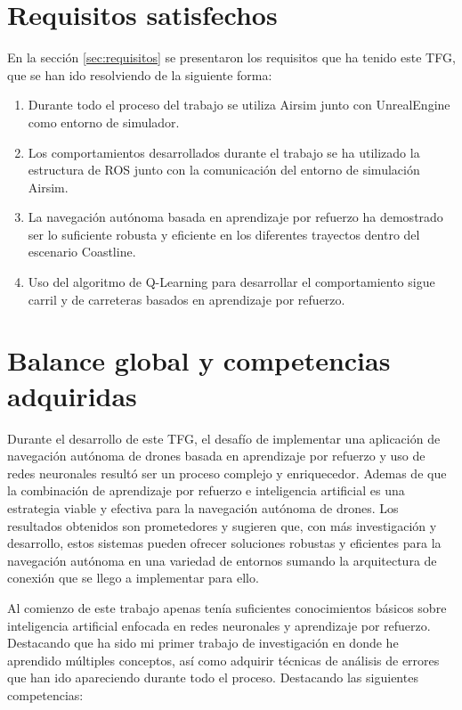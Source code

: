 \section{Requisitos satisfechos}
\label{requisitos_satisfechos}

En la sección \ref{sec:requisitos} se presentaron los requisitos que ha tenido este TFG, que se han ido resolviendo 
de la siguiente forma: 

\begin{enumerate}
    \item Durante todo el proceso del trabajo se utiliza Airsim junto con UnrealEngine como entorno de simulador.
    \item Los comportamientos desarrollados durante el trabajo se ha utilizado la estructura de ROS junto con la comunicación
    del entorno de simulación Airsim. 
    \item La navegación autónoma basada en aprendizaje por refuerzo ha demostrado ser lo suficiente robusta y eficiente en los
    diferentes trayectos dentro del escenario Coastline. 
    \item Uso del algoritmo de Q-Learning para desarrollar el comportamiento sigue carril y de carreteras basados en aprendizaje por 
    refuerzo.
\end{enumerate}


\section{Balance global y competencias adquiridas}
\label{balance_global_competencias_adquiridas}
Durante el desarrollo de este TFG, el desafío de implementar una aplicación de navegación autónoma de drones basada en
aprendizaje por refuerzo y uso de redes neuronales resultó ser un proceso complejo y enriquecedor. Ademas de que la
combinación de aprendizaje por refuerzo e inteligencia artificial es una estrategia viable y efectiva para la
navegación autónoma de drones. Los resultados obtenidos son prometedores y sugieren que, con más investigación y
desarrollo, estos sistemas pueden ofrecer soluciones robustas y eficientes para la navegación autónoma en una variedad
de entornos sumando la arquitectura de conexión que se llego a implementar para ello. 

Al comienzo de este trabajo apenas tenía suficientes conocimientos básicos sobre inteligencia artificial enfocada en
redes neuronales y aprendizaje por refuerzo. Destacando que ha sido mi primer trabajo de investigación en donde he
aprendido múltiples conceptos, así como adquirir técnicas de análisis de errores que han ido apareciendo durante todo
el proceso. Destacando las siguientes competencias: 

